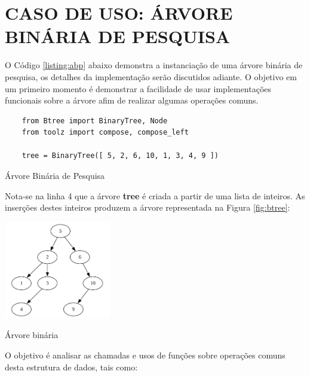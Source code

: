 \section{CASO DE USO: ÁRVORE BINÁRIA DE PESQUISA}

O Código \ref{listing:abp} abaixo demonstra a instanciação de uma árvore binária de pesquisa, os detalhes da implementação
serão discutidos adiante. O objetivo em um primeiro momento é demonstrar a facilidade de usar implementações funcionais
sobre a árvore afim de realizar algumas operações comuns.

\begin{listing}[H]
    \begin{verbatim}
    from Btree import BinaryTree, Node
    from toolz import compose, compose_left
    
    tree = BinaryTree([ 5, 2, 6, 10, 1, 3, 4, 9 ])
    \end{verbatim}
    \caption{Árvore Binária de Pesquisa}
    \label{listing:abp}
\end{listing}

Nota-se na linha 4 que a árvore \textbf{tree} é criada a partir de uma lista de inteiros.
As inserções destes inteiros produzem a árvore representada na Figura \ref{fig:btree}:

\begin{figlisting}[H]
    \centering
    \includegraphics[width=0.35\textwidth]{figs/btree.png} %
    \caption{Árvore binária} %
    \label{fig:btree}
\end{figlisting}

O objetivo é analisar as chamadas e usos de funções sobre operações comuns desta estrutura de dados, tais como:

